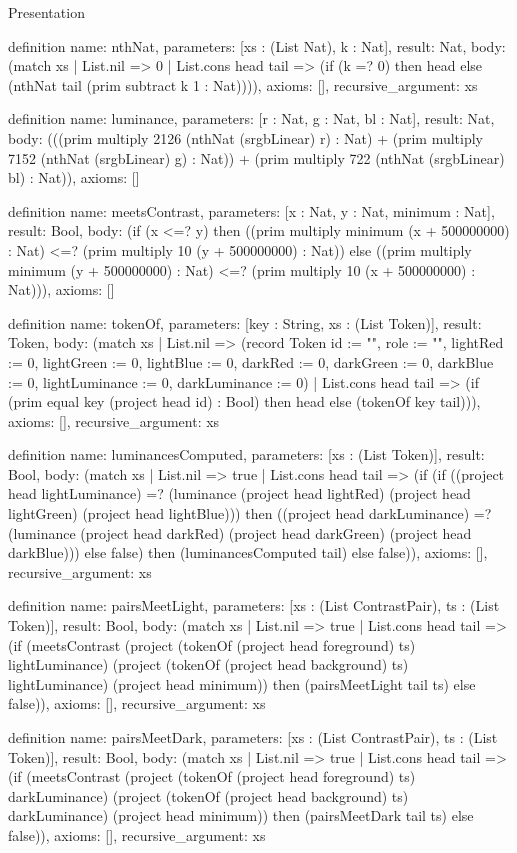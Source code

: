 \begin{lexlean}{Presentation}
\begin{semanticmodule}
definition{
  name: nthNat,
  parameters: [xs : (List Nat), k : Nat],
  result: Nat,
  body: (match xs
    | List.nil => 0
    | List.cons head tail => (if (k =? 0) then head else (nthNat tail (prim subtract k 1 : Nat)))),
  axioms: [],
  recursive_argument: xs
}

definition{
  name: luminance,
  parameters: [r : Nat, g : Nat, bl : Nat],
  result: Nat,
  body: (((prim multiply 2126 (nthNat (srgbLinear) r) : Nat) + (prim multiply 7152 (nthNat (srgbLinear) g) : Nat)) + (prim multiply 722 (nthNat (srgbLinear) bl) : Nat)),
  axioms: []
}

definition{
  name: meetsContrast,
  parameters: [x : Nat, y : Nat, minimum : Nat],
  result: Bool,
  body: (if (x <=? y) then ((prim multiply minimum (x + 500000000) : Nat) <=? (prim multiply 10 (y + 500000000) : Nat)) else ((prim multiply minimum (y + 500000000) : Nat) <=? (prim multiply 10 (x + 500000000) : Nat))),
  axioms: []
}

definition{
  name: tokenOf,
  parameters: [key : String, xs : (List Token)],
  result: Token,
  body: (match xs
    | List.nil => (record Token {id := "", role := "", lightRed := 0, lightGreen := 0, lightBlue := 0, darkRed := 0, darkGreen := 0, darkBlue := 0, lightLuminance := 0, darkLuminance := 0})
    | List.cons head tail => (if (prim equal key (project head id) : Bool) then head else (tokenOf key tail))),
  axioms: [],
  recursive_argument: xs
}

definition{
  name: luminancesComputed,
  parameters: [xs : (List Token)],
  result: Bool,
  body: (match xs
    | List.nil => true
    | List.cons head tail => (if (if ((project head lightLuminance) =? (luminance (project head lightRed) (project head lightGreen) (project head lightBlue))) then ((project head darkLuminance) =? (luminance (project head darkRed) (project head darkGreen) (project head darkBlue))) else false) then (luminancesComputed tail) else false)),
  axioms: [],
  recursive_argument: xs
}

definition{
  name: pairsMeetLight,
  parameters: [xs : (List ContrastPair), ts : (List Token)],
  result: Bool,
  body: (match xs
    | List.nil => true
    | List.cons head tail => (if (meetsContrast (project (tokenOf (project head foreground) ts) lightLuminance) (project (tokenOf (project head background) ts) lightLuminance) (project head minimum)) then (pairsMeetLight tail ts) else false)),
  axioms: [],
  recursive_argument: xs
}

definition{
  name: pairsMeetDark,
  parameters: [xs : (List ContrastPair), ts : (List Token)],
  result: Bool,
  body: (match xs
    | List.nil => true
    | List.cons head tail => (if (meetsContrast (project (tokenOf (project head foreground) ts) darkLuminance) (project (tokenOf (project head background) ts) darkLuminance) (project head minimum)) then (pairsMeetDark tail ts) else false)),
  axioms: [],
  recursive_argument: xs
}


\end{semanticmodule}
\end{lexlean}
